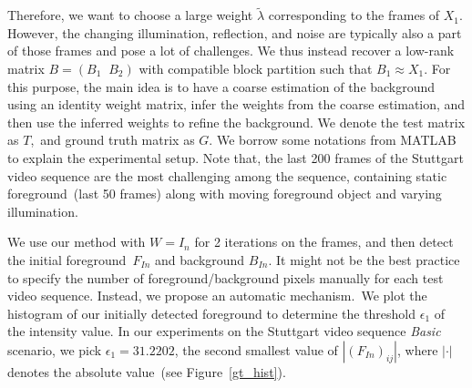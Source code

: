 \documentclass[twoside,11pt]{article}
\begin{document}
Therefore, we want to choose a large weight $\tilde{\lambda}$ corresponding to the frames of $X_1$. However, the changing illumination, reflection, and noise are typically also a part of those frames and pose a lot of challenges. We thus instead recover a low-rank matrix $B=(B_1\;\;B_2)$ with compatible block partition such that $B_1\approx X_1$. For this purpose, the main idea is to have a coarse estimation of the background using an identity weight matrix, infer the weights from the coarse estimation, and then use the inferred weights to refine the background.
We denote the test matrix as $T$,~and ground truth matrix as $G$. We borrow some notations from MATLAB to explain the experimental setup. Note that, the last 200 frames of the Stuttgart video sequence are the most challenging among the sequence, containing static foreground~(last 50 frames) along with moving foreground object and varying illumination. 


We use our method with $W=I_n$ for 2 iterations on the frames, and then detect the initial foreground~$F_{In}$ and background $B_{In}$. It might not be the best practice to specify the number of foreground/background pixels manually for each test video sequence. Instead, we propose an automatic mechanism.~We plot the histogram of our initially detected foreground to determine the threshold $\epsilon_1$ of the intensity value. In our experiments on the Stuttgart video sequence {\it Basic} scenario, we pick $\epsilon_1=31.2202$, the second smallest value of $|(F_{In})_{ij}|$, where $|\cdot|$ denotes the absolute value~(see Figure~\ref{gt_hist}).
\end{document}

